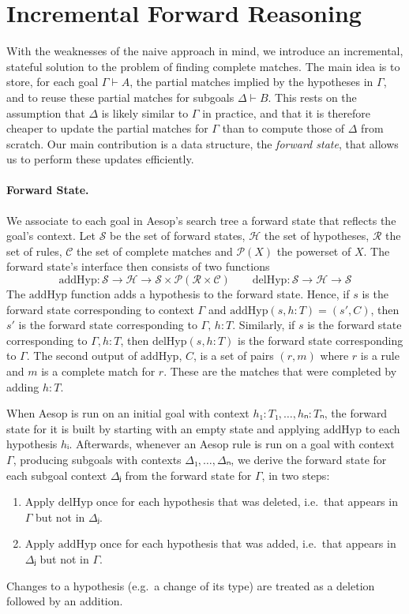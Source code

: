 \documentclass[runningheads,leqno]{llncs}
\newcommand{\Rules}{\ensuremath{\mathcal{R}}}
\newcommand{\Hyps}{\ensuremath{\mathcal{H}}}
\newcommand{\States}{\ensuremath{\mathcal{S}}}
\newcommand{\CMatches}{\ensuremath{\mathcal{C}}}
\newcommand{\addHyp}{\ensuremath{\mathrm{addHyp}}}
\newcommand{\delHyp}{\ensuremath{\mathrm{delHyp}}}
\newcommand{\powerset}{\ensuremath{\mathcal{P}}}
\begin{document}
\section{Incremental Forward Reasoning}%
\label{sec:incremental}

With the weaknesses of the naive approach in mind, we introduce an incremental, stateful solution to the problem of finding complete matches.
The main idea is to store, for each goal $Γ ⊢ A$, the partial matches implied by the hypotheses in $Γ$, and to reuse these partial matches for subgoals $Δ ⊢ B$.
This rests on the assumption that $Δ$ is likely similar to $Γ$ in practice, and that it is therefore cheaper to update the partial matches for $Γ$ than to compute those of $Δ$ from scratch.
Our main contribution is a data structure, the \emph{forward state}, that allows us to perform these updates efficiently.

\paragraph{Forward State.}
We associate to each goal in Aesop's search tree a forward state that reflects the goal's context.
Let $\States$ be the set of forward states, $\Hyps$ the set of hypotheses, $\Rules$ the set of rules, $\CMatches$ the set of complete matches and $\powerset(X)$ the powerset of $X$.
The forward state's interface then consists of two functions
\begin{equation*}
  \addHyp : \States → \Hyps → \States × \powerset(\Rules × \CMatches) \qquad \delHyp : \States → \Hyps → \States
\end{equation*}
The $\addHyp$ function adds a hypothesis to the forward state.
Hence, if $s$ is the forward state corresponding to context $Γ$ and $\addHyp(s, h : T) = (s', C)$, then $s'$ is the forward state corresponding to $Γ,\, h : T$.
Similarly, if $s$ is the forward state corresponding to $Γ, h : T$, then $\delHyp(s, h : T)$ is the forward state corresponding to $Γ$.
The second output of $\addHyp$, $C$, is a set of pairs $(r, m)$ where $r$ is a rule and $m$ is a complete match for $r$.
These are the matches that were completed by adding $h : T$.

When Aesop is run on an initial goal with context $h₁ : T₁, \dots, hₙ : Tₙ$, the forward state for it is built by starting with an empty state and applying $\addHyp$ to each hypothesis $hᵢ$.
Afterwards, whenever an Aesop rule is run on a goal with context $Γ$, producing subgoals with contexts $Δ₁, \dots, Δₙ$, we derive the forward state for each subgoal context $Δⱼ$ from the forward state for $Γ$, in two steps:
\begin{enumerate}
  \item Apply $\delHyp$ once for each hypothesis that was deleted, i.e.\ that appears in $Γ$ but not in $Δⱼ$.
  \item Apply $\addHyp$ once for each hypothesis that was added, i.e.\ that appears in $Δⱼ$ but not in $Γ$.
\end{enumerate}
Changes to a hypothesis (e.g.\ a change of its type) are treated as a deletion followed by an addition.
\end{document}
